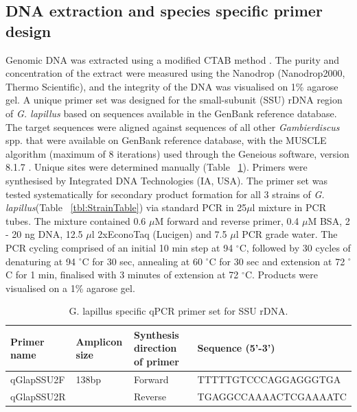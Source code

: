 \documentclass[12pt]{article}
\begin{document}
\subsection*{DNA extraction and species specific primer design}
\FloatBarrier
Genomic DNA was extracted using a modified CTAB method \citep{verma2016molecular}. 
The purity and concentration of the extract were measured using the Nanodrop (Nanodrop2000, Thermo Scientific), and the integrity of the DNA was visualised on 1\% agarose gel.
A unique primer set was designed for the small-subunit (SSU) rDNA region of \emph{G. lapillus} %
based on sequences available in the GenBank reference database. 
The target sequences were aligned against sequences of all other \emph{Gambierdiscus} spp. that were available on GenBank reference database, with the MUSCLE algorithm (maximum of 8 iterations) \citep{edgar2004muscle} used through the Geneious software, version 8.1.7 \citep{kearse2012geneious}. 
Unique sites were determined manually (Table ~\ref{tbl:PrimerTable}). 
Primers were synthesised by Integrated DNA Technologies (IA, USA).
The primer set was tested systematically for secondary product formation for all 3 strains of \emph{G. lapillus}(Table ~\ref{tbl:StrainTable}) via standard PCR in 25$\mu$l mixture in PCR tubes.  %
The mixture contained 0.6 $\mu$M forward and reverse primer, 0.4 $\mu$M BSA, 2 - 20 ng DNA, 12.5 $\mu$l 2xEconoTaq (Lucigen) and 7.5 $\mu$l PCR grade water.
The PCR cycling comprised of an initial 10 min step at 94 $^{\circ}$C, followed by 30 cycles of denaturing at 94 $^{\circ}$C for 30 sec, annealing at 60 $^{\circ}$C for 30 sec and extension at 72 $^{\circ}$C for 1 min, finalised with 3 minutes of extension at 72 $^{\circ}$C. 
Products were visualised on a 1\% agarose gel.
\begin{table}
\caption{G. lapillus specific qPCR primer set for SSU rDNA.}
\label{tbl:PrimerTable}
\begin{tabular}{ | p{2.5cm} | p{2cm} | p{2cm} | p{6.5cm} | }
\hline
\textbf{Primer name} &\textbf{Amplicon size} &  \textbf{Synthesis direction of primer} & \textbf{Sequence (5'-3')} \\
\hline
qGlapSSU2F&138bp&Forward&TTTTTGTCCCAGGAGGGTGA\\
\hline
qGlapSSU2R&&Reverse&TGAGGCCAAAACTCGAAAATC\\
\hline
\end{tabular}
\end{table}
\FloatBarrier
\end{document}
